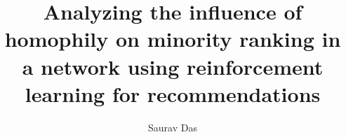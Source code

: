 \documentclass{llncs}
\begin{document}
\pagestyle{headings}

\title{Analyzing the influence of homophily on minority ranking in a network using reinforcement learning for recommendations}
\author{Saurav Das}

\maketitle











\end{document}
